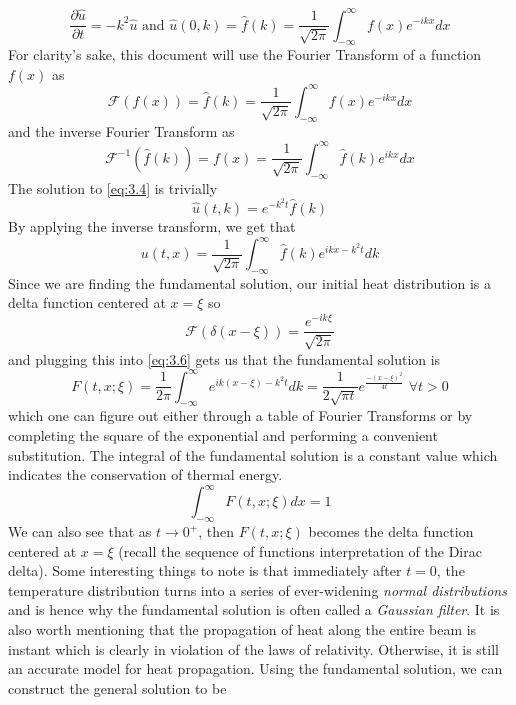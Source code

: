 \documentclass{article}
\newcommand{\pd}[2]{\frac{\partial #1}{\partial #2}}
\numberwithin{equation}{section}
\begin{document}
\begin{equation}
    \pd{\hat{u}}{t} =-k^2\hat{u} \text{ and } \hat{u}(0,k) =\hat{f}(k) = \frac{1}{\sqrt{2\pi}}\int^\infty_{-\infty} f(x)e^{-ikx}dx \label{eq:3.4}
\end{equation}
For clarity's sake, this document will use the Fourier Transform of a function $f(x)$ as
\begin{equation*}
    \mathscr{F}(f(x)) = \hat{f}(k) =\frac{1}{\sqrt{2\pi}}\int^\infty_{-\infty} f(x)e^{-ikx}dx
\end{equation*}
and the inverse Fourier Transform as 
\begin{equation*}
    \mathscr{F}^{-1}(\hat{f}(k)) = f(x)= \frac{1}{\sqrt{2\pi}} \int^\infty_{-\infty} \hat{f}(k)e^{ikx}dx
\end{equation*}
The solution to \eqref{eq:3.4} is trivially 
\begin{equation}
    \hat{u}(t,k) =e^{-k^2t}\hat{f}(k)
\end{equation}
By applying the inverse transform, we get that 
\begin{equation}
    u(t,x) =\frac{1}{\sqrt{2\pi}}\int^\infty_{-\infty}\hat{f}(k)e^{ikx-k^2t} dk \label{eq:3.6}
\end{equation}
Since we are finding the fundamental solution, our initial heat distribution is a delta function centered at $x=\xi$ so 
\begin{equation*}
    \mathscr{F}(\delta(x-\xi)) = \frac{e^{-ik\xi}}{\sqrt{2\pi}}
\end{equation*}
and plugging this into \eqref{eq:3.6} gets us that the fundamental solution is 
\begin{equation}
    F(t,x;\xi) =\frac{1}{2\pi}\int^\infty_{-\infty}e^{ik(x-\xi)-k^2t}dk = \frac{1}{2\sqrt{\pi t}}e^{\frac{-(x-\xi)^2}{4t}} \hspace{4pt} \forall t>0
\end{equation}
which one can figure out either through a table of Fourier Transforms or by completing the square of the exponential and performing a convenient substitution. 
The integral of the fundamental solution is a constant value which indicates the conservation of thermal energy.
\begin{equation*}
    \int^\infty_{-\infty} F(t,x;\xi) dx = 1
\end{equation*}
We can also see that as $t\rightarrow0^+$, then $F(t,x;\xi)$ becomes the delta function centered at $x=\xi$ (recall the sequence of functions interpretation of the Dirac delta). Some interesting things to note is that immediately after $t=0$, the temperature distribution turns into a series of ever-widening \textit{normal distributions} and is hence why the fundamental solution is often called a \textit{Gaussian filter}. It is also worth mentioning that the propagation of heat along the entire beam is instant which is clearly in violation of the laws of relativity. Otherwise, it is still an accurate model for heat propagation. Using the fundamental solution, we can construct the general solution to be 
\end{document}
